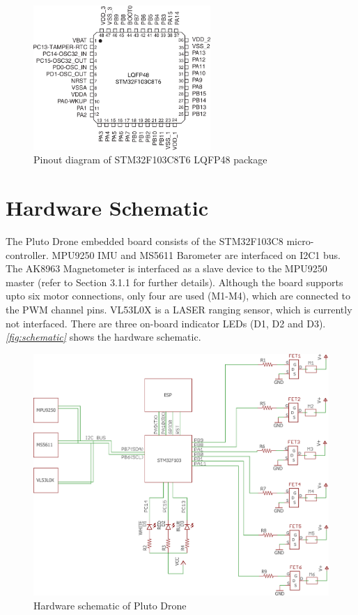 \documentclass[a4paper,12pt,oneside]{book}
\begin{document}
\begin{figure}[!htb]
\centering
\includegraphics[width=0.6\textwidth]{images/stm32_pinout}
\caption{Pinout diagram of STM32F103C8T6 LQFP48 package}
\end{figure}

\section{Hardware Schematic}
The Pluto Drone embedded board consists of the STM32F103C8 micro-controller. MPU9250 IMU and MS5611 Barometer are interfaced on I2C1 bus. The AK8963 Magnetometer is interfaced as a slave device to the MPU9250 master (refer to Section 3.1.1 for further details). Although the board supports upto six motor connections, only four are used (M1-M4), which are connected to the PWM channel pins. VL53L0X is a LASER ranging sensor, which is currently not interfaced. There are three on-board indicator LEDs (D1, D2 and D3). \textit{\autoref{fig:schematic}} shows the hardware schematic.

\begin{figure}[!htb]
\centering
\includegraphics[width=\textwidth]{images/pluto_drone_schematic}
\caption{Hardware schematic of Pluto Drone}
\label{fig:schematic}
\end{figure}
\end{document}
